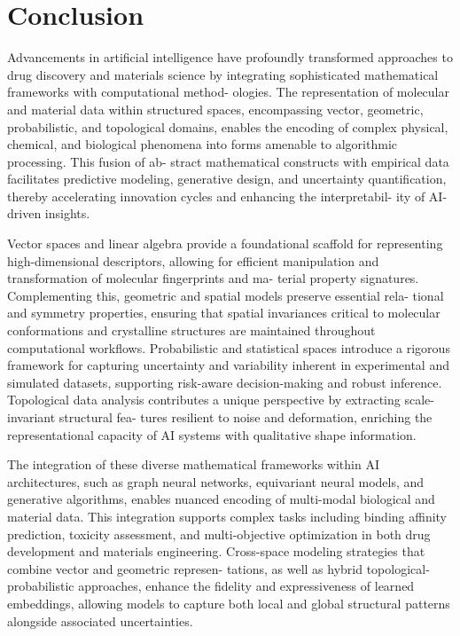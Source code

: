 \documentclass[
]{article}
\begin{document}
\section{Conclusion}\label{conclusion}

Advancements in artificial intelligence have profoundly transformed
approaches to drug discovery and materials science by integrating
sophisticated mathematical frameworks with computational method-
ologies. The representation of molecular and material data within
structured spaces, encompassing vector, geometric, probabilistic, and
topological domains, enables the encoding of complex physical, chemical,
and biological phenomena into forms amenable to algorithmic processing.
This fusion of ab- stract mathematical constructs with empirical data
facilitates predictive modeling, generative design, and uncertainty
quantification, thereby accelerating innovation cycles and enhancing the
interpretabil- ity of AI-driven insights.

Vector spaces and linear algebra provide a foundational scaffold for
representing high-dimensional descriptors, allowing for efficient
manipulation and transformation of molecular fingerprints and ma- terial
property signatures. Complementing this, geometric and spatial models
preserve essential rela- tional and symmetry properties, ensuring that
spatial invariances critical to molecular conformations and crystalline
structures are maintained throughout computational workflows.
Probabilistic and statistical spaces introduce a rigorous framework for
capturing uncertainty and variability inherent in experimental and
simulated datasets, supporting risk-aware decision-making and robust
inference. Topological data analysis contributes a unique perspective by
extracting scale-invariant structural fea- tures resilient to noise and
deformation, enriching the representational capacity of AI systems with
qualitative shape information.

The integration of these diverse mathematical frameworks within AI
architectures, such as graph neural networks, equivariant neural models,
and generative algorithms, enables nuanced encoding of multi-modal
biological and material data. This integration supports complex tasks
including binding affinity prediction, toxicity assessment, and
multi-objective optimization in both drug development and materials
engineering. Cross-space modeling strategies that combine vector and
geometric represen- tations, as well as hybrid topological-probabilistic
approaches, enhance the fidelity and expressiveness of learned
embeddings, allowing models to capture both local and global structural
patterns alongside associated uncertainties.
\end{document}
